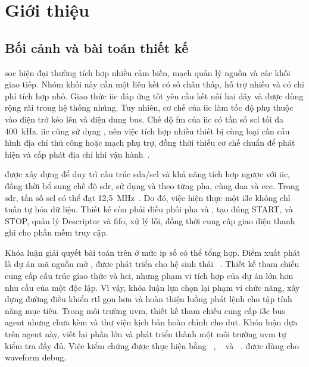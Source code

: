 \chapter{Giới thiệu}
\label{ch:introduction}

\section{Bối cảnh và bài toán thiết kế}
\label{sec:intro-motivation}

\gls{soc} hiện đại thường tích hợp nhiều cảm biến, mạch quản lý nguồn và các khối giao tiếp.
Nhóm khối này cần một liên kết có số chân thấp, hỗ trợ nhiều \Target{} và có chi phí tích hợp nhỏ. Giao thức
\gls{iic} đáp ứng tốt yêu cầu kết nối hai dây và được dùng rộng rãi trong hệ thống nhúng.
Tuy nhiên, cơ chế \OpenDrain{} của \gls{iic} làm tốc độ phụ thuộc vào điện trở kéo lên và điện
dung bus. Chế độ \gls{fm} của \gls{iic} có tần số \gls{scl} tối đa 400~kHz. \gls{iic} cũng sử dụng \StaticAddress{}, nên việc
tích hợp nhiều thiết bị cùng loại cần cấu hình địa chỉ thủ công hoặc mạch phụ trợ, đồng thời thiếu cơ chế
chuẩn để phát hiện và cấp phát địa chỉ khi vận hành~\cite{nxp_i2c,mipi_i3c_basic}.

\MIPIIThreeCBasic{} được xây dựng để duy trì cấu trúc \gls{sda}/\gls{scl} và khả năng tích hợp ngược với \Target{}
\gls{iic}, đồng thời bổ sung chế độ \gls{sdr}, sử dụng \OpenDrain{} và \PushPull{} theo từng pha, cùng \gls{daa} và \gls{ccc}. Trong \gls{sdr}, tần số \gls{scl} có thể đạt 12,5~MHz~\cite{mipi_i3c_basic}. Do đó, việc hiện thực
một \gls{i3c} \Controller{} không chỉ tuần tự hóa dữ liệu. Thiết kế còn phải điều phối pha \OpenDrain{} và \PushPull{}, tạo đúng START, \RepeatedSTART{} và STOP, quản lý Descriptor và \gls{fifo}, xử lý lỗi,
đồng thời cung cấp giao diện thanh ghi cho phần mềm truy cập.

Khóa luận giải quyết bài toán trên ở mức \gls{ip} số có thể tổng hợp. Điểm xuất phát là dự án mã nguồn mở \CHIPSAlliance{} \IThreeCCore{}, được phát triển cho hệ sinh thái \Caliptra{}~\cite{chipsalliance_i3c}.
Thiết kế tham chiếu cung cấp cấu trúc giao thức và \gls{hci}, nhưng phạm vi tích hợp của dự án lớn
hơn nhu cầu của một \Controller{} độc lập. Vì vậy, khóa luận lựa chọn lại phạm vi chức năng, xây dựng
đường điều khiển \gls{rtl} gọn hơn và hoàn thiện luồng phát lệnh cho tập tính năng mục tiêu. Trong môi trường \gls{uvm}, thiết kế tham chiếu cung cấp \gls{i3c} bus agent nhưng chưa kèm \Scoreboard{} và thư viện kịch bản hoàn chỉnh cho \gls{dut}. Khóa luận dựa trên agent này, viết lại phần lớn và phát triển thành một môi trường \gls{uvm} tự kiểm tra đầy đủ. Việc kiểm chứng được
thực hiện bằng \SystemVerilog{}~\cite{ieee1800}, \UVMVersion{}~\cite{uvm12_ug} và
\CadenceXcelium{}~\cite{cadence_xcelium}. \SimVision{} được dùng cho waveform debug.


